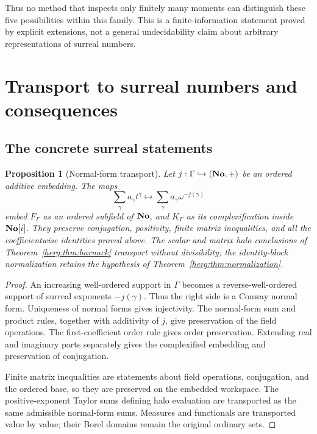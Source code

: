 \documentclass[11pt,letterpaper]{article}
\newtheorem{proposition}[theorem]{Proposition}
\theoremstyle{definition}
\newcommand{\FG}{F_\Gamma}\newcommand{\KG}{K_\Gamma}
\numberwithin{equation}{section}
\begin{document}
Thus no method that inspects only finitely many moments can distinguish these five possibilities within this family. This is a finite-information statement proved by explicit extensions, not a general undecidability claim about arbitrary representations of surreal numbers.

\section{Transport to surreal numbers and consequences}
\label{herg:sec:transport}

\subsection{The concrete surreal statements}

\begin{proposition}[Normal-form transport]\label{herg:prop:transport}
Let $j:\Gamma\hookrightarrow(\mathbf{No},+)$ be an ordered additive embedding. The maps
\begin{equation}\label{herg:eq:transport}
 \sum_\gamma a_\gamma t^\gamma\longmapsto
 \sum_\gamma a_\gamma\omega^{-j(\gamma)}
\end{equation}
embed $\FG$ as an ordered subfield of $\mathbf{No}$, and $\KG$ as its complexification inside $\mathbf{No}[i]$. They preserve conjugation, positivity, finite matrix inequalities, and all the coefficientwise identities proved above. The scalar and matrix halo conclusions of
Theorem~\ref{herg:thm:harnack} transport without divisibility; the
identity-block normalization retains the hypothesis of
Theorem~\ref{herg:thm:normalization}.
\end{proposition}
\begin{proof}
An increasing well-ordered support in $\Gamma$ becomes a reverse-well-ordered support of surreal exponents $-j(\gamma)$. Thus the right side is a Conway normal form. Uniqueness of normal forms gives injectivity. The normal-form sum and product rules, together with additivity of $j$, give preservation of the field operations. The first-coefficient order rule gives order preservation. Extending real and imaginary parts separately gives the complexified embedding and preservation of conjugation.

Finite matrix inequalities are statements about field operations, conjugation, and the ordered base, so they are preserved on the embedded workspace. The positive-exponent Taylor sums defining halo evaluation are transported as the same admissible normal-form sums. Measures and functionals are transported value by value; their Borel domains remain the original ordinary sets.
\end{proof}
\end{document}
